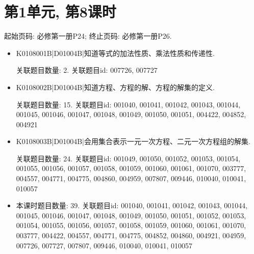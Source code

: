 \section*{第1单元, 第8课时}
起始页码: 必修第一册P24; 终止页码: 必修第一册P26.
\begin{itemize}
\item K0108001B|D01004B|知道等式的加法性质、乘法性质和传递性.

关联题目数量: 2. 关联题目id: 007726, 007727

\item K0108002B|D01004B|知道方程、方程的解、方程的解集的定义.

关联题目数量: 15. 关联题目id: 001040, 001041, 001042, 001043, 001044, 001045, 001046, 001047, 001048, 001049, 001050, 001051, 004422, 004852, 004921

\item K0108003B|D01004B|会用集合表示一元一次方程、二元一次方程组的解集.

关联题目数量: 24. 关联题目id: 001049, 001050, 001052, 001053, 001054, 001055, 001056, 001057, 001058, 001059, 001060, 001061, 001070, 003777, 004557, 004771, 004775, 004860, 004959, 007807, 009446, 010040, 010041, 010057

\item 本课时题目数量: 39. 关联题目id: 001040, 001041, 001042, 001043, 001044, 001045, 001046, 001047, 001048, 001049, 001050, 001051, 001052, 001053, 001054, 001055, 001056, 001057, 001058, 001059, 001060, 001061, 001070, 003777, 004422, 004557, 004771, 004775, 004852, 004860, 004921, 004959, 007726, 007727, 007807, 009446, 010040, 010041, 010057

\end{itemize}


